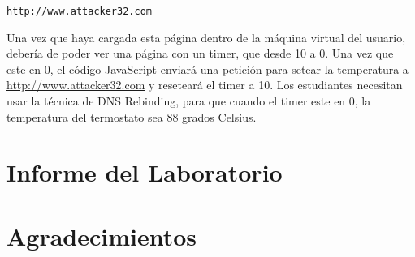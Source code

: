 \begin{lstlisting}
http://www.attacker32.com
\end{lstlisting}
 
Una vez que haya cargada esta página dentro de la máquina virtual del usuario, debería de poder ver una página con un timer, que desde 10 a 0. Una vez que este en 0, el código JavaScript enviará una petición para setear la temperatura a \url{http://www.attacker32.com} y reseteará el timer a 10.
Los estudiantes necesitan usar la técnica de DNS Rebinding, para que cuando el timer este en 0, la temperatura del termostato sea 88 grados Celsius.

\section{Informe del Laboratorio}



\section*{Agradecimientos}






